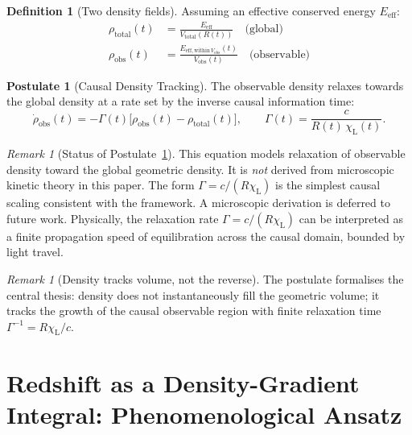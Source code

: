 \documentclass[12pt,a4paper]{amsart}
\theoremstyle{plain}
\theoremstyle{definition}
\newtheorem{definition}[theorem]{Definition}
\newtheorem{postulate}[theorem]{Postulate}
\theoremstyle{remark}
\newtheorem{remark}[theorem]{Remark}
\newcommand{\Vtot}{V_{\mathrm{total}}}
\newcommand{\Vobs}{V_{\mathrm{obs}}}
\newcommand{\chiL}{\chi_{\mathrm{L}}}
\newcommand{\rhotot}{\rho_{\mathrm{total}}}
\newcommand{\rhoobs}{\rho_{\mathrm{obs}}}
\newcommand{\Eeff}{E_{\mathrm{eff}}}
\begin{document}
\begin{definition}[Two density fields]
  \label{def:rhotwo}
  Assuming an effective conserved energy $\Eeff$:
  \begin{align}
    \rhotot(t) &= \frac{\Eeff}{\Vtot(R(t))}\quad\text{(global)}\label{eq:rhotot}\\
    \rhoobs(t) &= \frac{E_{\mathrm{eff,within}\,\Vobs}(t)}{\Vobs(t)}
                 \quad\text{(observable)}\label{eq:rhoobs}
  \end{align}
\end{definition}

\begin{postulate}[Causal Density Tracking]
  \label{post:tracking}
  The observable density relaxes towards the global density at a rate
  set by the inverse causal information time:
  \begin{equation}
    \boxed{
      \dot\rhoobs(t) = -\Gamma(t)\bigl[\rhoobs(t) - \rhotot(t)\bigr],
      \qquad \Gamma(t) = \frac{c}{R(t)\,\chiL(t)}.
    }
    \label{eq:tracking}
  \end{equation}
\end{postulate}

\begin{remark}[Status of Postulate~\ref{post:tracking}]
  This equation models relaxation of observable density toward the
  global geometric density. It is \emph{not} derived from microscopic
  kinetic theory in this paper. The form $\Gamma=c/(R\chiL)$ is the
  simplest causal scaling consistent with the framework. A microscopic
  derivation is deferred to future work. Physically, the relaxation
  rate $\Gamma=c/(R\chiL)$ can be interpreted as a finite propagation
  speed of equilibration across the causal domain, bounded by light
  travel.
\end{remark}

\begin{remark}[Density tracks volume, not the reverse]
  The postulate formalises the central thesis: density does not
  instantaneously fill the geometric volume; it tracks the growth of
  the causal observable region with finite relaxation time
  $\Gamma^{-1}=R\chiL/c$.
\end{remark}

\section{Redshift as a Density-Gradient Integral: Phenomenological Ansatz}
\label{sec:redshift}
\end{document}
